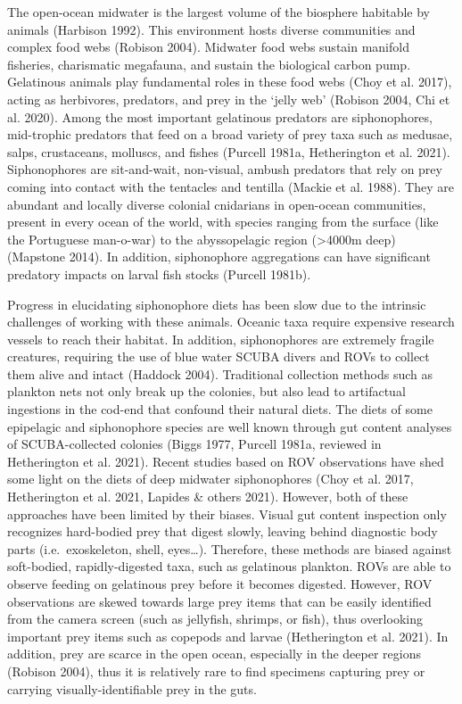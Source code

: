 \documentclass[12pt,]{article}
\begin{document}
The open-ocean midwater is the largest volume of the biosphere habitable by animals (Harbison 1992). This environment hosts diverse communities and complex food webs (Robison 2004). Midwater food webs sustain manifold fisheries, charismatic megafauna, and sustain the biological carbon pump. Gelatinous animals play fundamental roles in these food webs (Choy et al. 2017), acting as herbivores, predators, and prey in the `jelly web' (Robison 2004, Chi et al. 2020). Among the most important gelatinous predators are siphonophores, mid-trophic predators that feed on a broad variety of prey taxa such as medusae, salps, crustaceans, molluscs, and fishes (Purcell 1981a, Hetherington et al. 2021). Siphonophores are sit-and-wait, non-visual, ambush predators that rely on prey coming into contact with the tentacles and tentilla (Mackie et al. 1988). They are abundant and locally diverse colonial cnidarians in open-ocean communities, present in every ocean of the world, with species ranging from the surface (like the Portuguese man-o-war) to the abyssopelagic region (\textgreater{}4000m deep) (Mapstone 2014). In addition, siphonophore aggregations can have significant predatory impacts on larval fish stocks (Purcell 1981b).

Progress in elucidating siphonophore diets has been slow due to the intrinsic challenges of working with these animals. Oceanic taxa require expensive research vessels to reach their habitat. In addition, siphonophores are extremely fragile creatures, requiring the use of blue water SCUBA divers and ROVs to collect them alive and intact (Haddock 2004). Traditional collection methods such as plankton nets not only break up the colonies, but also lead to artifactual ingestions in the cod-end that confound their natural diets. The diets of some epipelagic and siphonophore species are well known through gut content analyses of SCUBA-collected colonies (Biggs 1977, Purcell 1981a, reviewed in Hetherington et al. 2021). Recent studies based on ROV observations have shed some light on the diets of deep midwater siphonophores (Choy et al. 2017, Hetherington et al. 2021, Lapides \& others 2021). However, both of these approaches have been limited by their biases. Visual gut content inspection only recognizes hard-bodied prey that digest slowly, leaving behind diagnostic body parts (i.e.~exoskeleton, shell, eyes\ldots{}). Therefore, these methods are biased against soft-bodied, rapidly-digested taxa, such as gelatinous plankton. ROVs are able to observe feeding on gelatinous prey before it becomes digested. However, ROV observations are skewed towards large prey items that can be easily identified from the camera screen (such as jellyfish, shrimps, or fish), thus overlooking important prey items such as copepods and larvae (Hetherington et al. 2021). In addition, prey are scarce in the open ocean, especially in the deeper regions (Robison 2004), thus it is relatively rare to find specimens capturing prey or carrying visually-identifiable prey in the guts.
\end{document}
